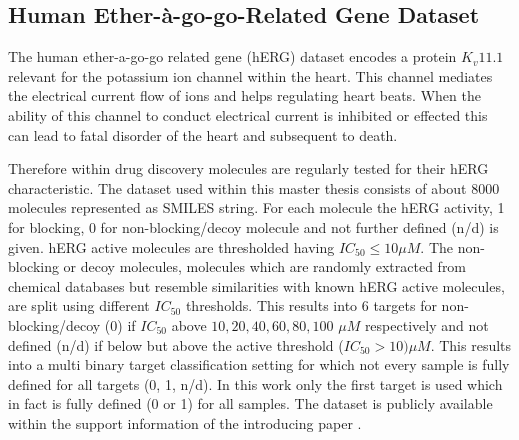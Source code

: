 \documentclass[../main.tex]{subfiles}
\begin{document}


\subsection{Human Ether-à-go-go-Related Gene Dataset} \label{ssec:herg_dataset}

The human ether-a-go-go related gene (hERG) dataset encodes a protein $K_v11.1$ relevant for the potassium ion channel within the heart. This channel mediates the electrical current flow of ions and helps regulating heart beats. When the ability of this channel to conduct electrical current is inhibited or effected this can lead to fatal disorder of the heart and subsequent to death. 

Therefore within drug discovery molecules are regularly tested for their hERG characteristic. The dataset used within this master thesis consists of about 8000 molecules represented as SMILES string. For each molecule the hERG activity, 1 for blocking, 0 for non-blocking/decoy molecule and not further defined (n/d) is given. hERG active molecules are thresholded having $IC_{50} \le 10 \mu M$. The non-blocking or decoy molecules, molecules which are randomly extracted from chemical databases but resemble similarities with known hERG active molecules, are split using different $IC_{50}$ thresholds. This results into 6 targets for non-blocking/decoy (0) if $IC_{50}$ above $10, 20, 40, 60, 80, 100$ $\mu M$ respectively and not defined (n/d) if below but above the active threshold ($IC_{50} > 10) \mu M$. This results into a multi binary target classification setting for which not every sample is fully defined for all targets (0, 1, n/d). In this work only the first target is used which in fact is fully defined (0 or 1) for all samples. The dataset is publicly available within the support information of the introducing paper \cite{cai_deep_2019}.
\newline
\end{document}

